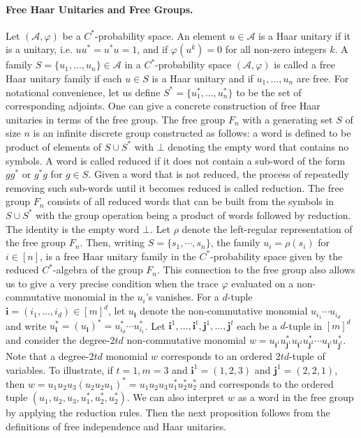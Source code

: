 \documentclass[10pt,a4paper]{article}
\begin{document}
\paragraph{Free Haar Unitaries and Free Groups.}
Let $(\mathcal A,\varphi)$ be a $C^*$-probability space. An element $u\in\mathcal A$ is a Haar unitary if it is a unitary, i.e. $uu^*=u^*u=1$, and if $\varphi(u^k)=0$ for all non-zero integers $k$. A family $S=\{u_1,\ldots,u_n\}\in\mathcal A$ in a $C^*$-probability space $(\mathcal A,\varphi)$ is called a free Haar unitary family if each $u\in S$ is a Haar unitary and if $u_1,\ldots,u_n$ are free. For notational convenience, let us define $S^*=\{u_1^*,\ldots,u_n^*\}$ to be the set of corresponding adjoints.
One can give a concrete construction of free Haar unitaries in terms of the free group. The free group $F_n$ with a generating set $S$ of size $n$ is an infinite discrete group constructed as follows: a word is defined to be product of elements of $S\cup S^*$ with $\bot$ denoting the empty word that contains no symbols. A word is called reduced if it does not contain a sub-word of the form $gg^*$ or $g^*g$ for $g\in S$. Given a word that is not reduced, the process of repeatedly removing such sub-words until it becomes reduced is called reduction. The free group $F_n$ consists of all reduced words that can be built from the symbols in $S\cup S^*$ with the group operation being a product of words followed by reduction. The identity is the empty word $\bot$.
Let $\rho$ denote the left-regular representation of the free group $F_n$. Then, writing $S=\{s_1,\cdots,s_n\}$, the family $u_i=\rho(s_i)$ for $i\in[n]$, is a free Haar unitary family in the $C^*$-probability space given by the reduced $C^*$-algebra of the group $F_n$. This connection to the free group also allows us to give a very precise condition when the trace $\varphi$ evaluated on a non-commutative monomial in the $u_i$'s vanishes. For a $d$-tuple $\mathbf i=(i_1,\ldots,i_d)\in[m]^d$, let $u_{\mathbf i}$ denote the non-commutative monomial $u_{i_1}\cdots u_{i_d}$ and write $u_{\mathbf i}^*=(u_{\mathbf i})^*=u_{i_d}^*\cdots u_{i_1}^*$. Let $\mathbf i^1,\ldots,\mathbf i^t,\mathbf j^1,\ldots,\mathbf j^t$ each be a $d$-tuple in $[m]^d$ and consider the degree-$2td$ non-commutative monomial $w=u_{\mathbf i^1}u_{\mathbf j^1}^*u_{\mathbf i^2}u_{\mathbf j^2}^*\cdots u_{\mathbf i^t}u_{\mathbf j^t}^*$. Note that a degree-$2td$ monomial $w$ corresponds to an ordered $2td$-tuple of variables. To illustrate, if $t=1,m=3$ and $\mathbf i^1=(1,2,3)$ and $\mathbf j^1=(2,2,1)$, then $w=u_1u_2u_3(u_2u_2u_1)^*=u_1u_2u_3u_1^*u_2^*u_2^*$ and corresponds to the ordered tuple $(u_1,u_2,u_3,u_1^*,u_2^*,u_2^*)$. We can also interpret $w$ as a word in the free group by applying the reduction rules. Then the next proposition follows from the definitions of free independence and Haar unitaries.
\end{document}
